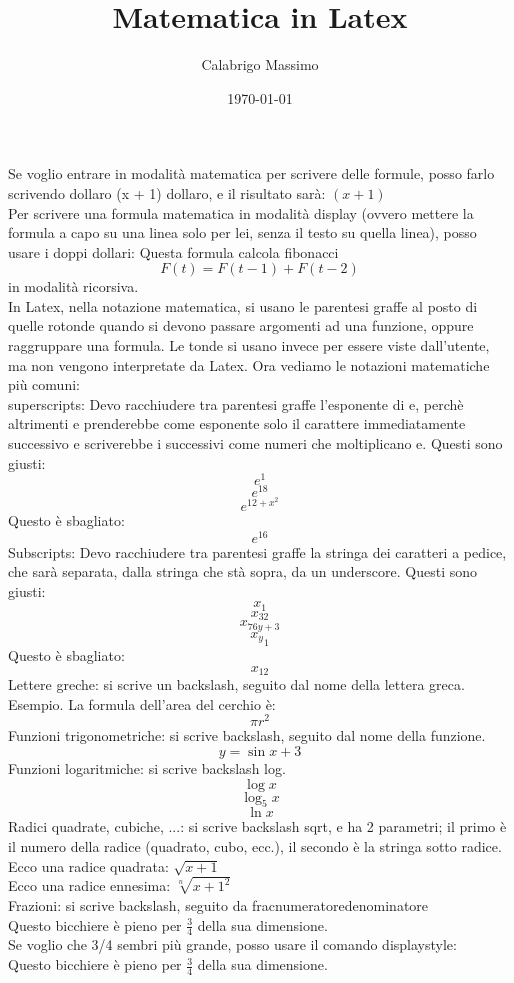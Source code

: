 \documentclass[11pt]{article}
\begin{document}
\title{Matematica in Latex}
\author{Calabrigo Massimo}
\date{\today}
\maketitle

Se voglio entrare in modalità matematica per scrivere delle formule, posso farlo scrivendo dollaro (x + 1) dollaro, e il risultato sarà: $ (x + 1) $\\
Per scrivere una formula matematica in modalità display (ovvero mettere la formula a capo su una linea solo per lei, 
senza il testo su quella linea), posso usare i doppi dollari: Questa formula calcola fibonacci $$ F(t) = F(t-1) + F(t-2) $$ in modalità ricorsiva.\\
In Latex, nella notazione matematica, si usano le parentesi graffe al posto di quelle rotonde quando si devono passare argomenti ad una funzione, oppure raggruppare una formula. 
Le tonde si usano invece per essere viste dall'utente, ma non vengono interpretate da Latex.
Ora vediamo le notazioni matematiche più comuni:\\
superscripts: Devo racchiudere tra parentesi graffe l'esponente di e, perchè altrimenti e prenderebbe come esponente solo il carattere immediatamente successivo 
e scriverebbe i successivi come numeri che moltiplicano e. Questi sono giusti:
$$ e^1 $$
$$ e^{18} $$
$$ e^{12+x^2} $$
Questo è sbagliato:
$$ e^16 $$
Subscripts: Devo racchiudere tra parentesi graffe la stringa dei caratteri a pedice, che sarà separata, dalla stringa che stà sopra, da un underscore. Questi sono giusti:
$$ x_1 $$
$$ x_{32} $$
$$ x_{76y+3} $$
$$ {x_y}_1 $$
Questo è sbagliato:
$$ x_12 $$
Lettere greche: si scrive un backslash, seguito dal nome della lettera greca.
Esempio. La formula dell'area del cerchio è: $$ \pi r^2 $$
Funzioni trigonometriche: si scrive backslash, seguito dal nome della funzione.
$$ y=\sin{x}+3 $$
Funzioni logaritmiche: si scrive backslash log.
$$ \log{x} $$
$$ \log_5{x} $$
$$ \ln{x} $$
Radici quadrate, cubiche, ...: si scrive backslash sqrt, e ha 2 parametri; il primo è il numero della radice (quadrato, cubo, ecc.), il secondo è la stringa sotto radice.\\
Ecco una radice quadrata: $ \sqrt{x+1} $\\
Ecco una radice ennesima: $ \sqrt[n]{{x+1}^2} $\\
Frazioni: si scrive backslash, seguito da frac{numeratore}{denominatore}\\
Questo bicchiere è pieno per $\frac{3}{4}$ della sua dimensione.\\
Se voglio che 3/4 sembri più grande, posso usare il comando displaystyle:\\
Questo bicchiere è pieno per $\displaystyle{\frac{3}{4}}$ della sua dimensione.\\
\end{document}
